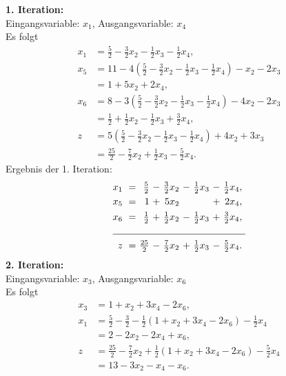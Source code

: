 \documentclass[a4paper]{article}
\begin{document}
\textbf{1. Iteration:}\\
Eingangsvariable: $x_1$, Ausgangsvariable: $x_4$ \\
Es folgt
\begin{align*}
 x_1 &= \tfrac{5}{2} - \tfrac{3}{2}x_2 -\tfrac{1}{2}x_3 - \tfrac{1}{2}x_4, \\
 x_5 &= 11 - 4 \left( \tfrac{5}{2} - \tfrac{3}{2}x_2 - \tfrac{1}{2}x_3 - \tfrac{1}{2}x_4 \right) - x_2 - 2x_3 \\
    &= 1 + 5x_2 + 2x_4, \\
 x_6 &= 8 - 3 \left( \tfrac{5}{2} - \tfrac{3}{2}x_2 - \tfrac{1}{2}x_3 - \tfrac{1}{2}x_4 \right) -4x_2 - 2x_3 \\
    &= \tfrac{1}{2} + \tfrac{1}{2}x_2 - \tfrac{1}{2}x_3 + \tfrac{3}{2}x_4, \\
z   &= 5 \left( \tfrac{5}{2} - \tfrac{3}{2}x_2 - \tfrac{1}{2}x_3 - \tfrac{1}{2}x_4 \right) + 4x_2 + 3x_3 \\
    &= \tfrac{25}{2} - \tfrac{7}{2}x_2 + \tfrac{1}{2}x_3 - \tfrac{5}{2}x_4.
\end{align*}
Ergebnis der 1. Iteration:
\begin{align*}
\begin{alignedat}{5}
x_1 &\ = &\  \tfrac{5}{2} &\ - &\ \tfrac{3}{2}x_2 &\ - &\ \tfrac{1}{2}x_3 &\ - &\ \tfrac{1}{2}x_4,\ \\
x_5 &\ = &\            1 &\ + &\           5x_2 &    &                 &\ + &\           2x_4,\ \\
x_6 &\ = &\  \tfrac{1}{2} &\ + &\ \tfrac{1}{2}x_2 &\ - &\ \tfrac{1}{2}x_3 &\ + &\ \tfrac{3}{2}x_4,\ \\ \cline{1-9}
z   &\ = &\ \tfrac{25}{2} &\ - &\ \tfrac{7}{2}x_2 &\ + &\ \tfrac{1}{2}x_3 &\ - &\ \tfrac{5}{2}x_4.\
\end{alignedat}
\end{align*}
\textbf{2. Iteration:} \\
Eingangsvariable: $x_3$, Ausgangsvariable: $x_6$\\
Es folgt
\begin{align*}
 x_3 &= 1 + x_2 + 3x_4 - 2x_6, \\
 x_1 &= \tfrac{5}{2} - \tfrac{3}{2} - \tfrac{1}{2} \left(1 + x_2 + 3x_4 - 2x_6\right) - \tfrac{1}{2}x_4 \\
    &= 2 - 2x_2 - 2x_4 + x_6, \\
  z &= \tfrac{25}{2} -\tfrac{7}{2}x_2 + \tfrac{1}{2} \left(1 + x_2 + 3x_4 - 2x_6 \right) - \tfrac{5}{2}x_4 \\
    &= 13 - 3x_2 - x_4 - x_6.
\end{align*}
\end{document}
